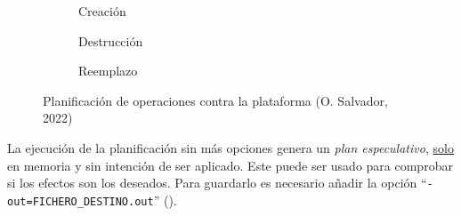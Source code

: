 \documentclass[11pt]{article}
\begin{document}
\begin{flushleft}
			\begin{figure}[htb]
				\begin{subfigure}{.49\textwidth}
					\centering
					\caption{Creación}
				\end{subfigure}
				\begin{subfigure}{.49\textwidth}
					\centering
					\caption{Destrucción}
				\end{subfigure}
				\linebreak
				
				\begin{subfigure}{.8\textwidth}
					\caption{Reemplazo}
				\end{subfigure}
				\caption{Planificación de operaciones contra la plataforma (O. Salvador, 2022)}
			\end{figure}

		La ejecución de la planificación sin más opciones genera un \textit{plan especulativo}, \underline{solo} en memoria y sin intención de ser aplicado. Este puede ser usado para comprobar si los efectos son los deseados. Para guardarlo es necesario añadir la opción ``\texttt{-out=FICHERO\_DESTINO.out}'' (\cite{hashicorp_plan}).
		\linebreak
		

\end{flushleft}
\end{document}
